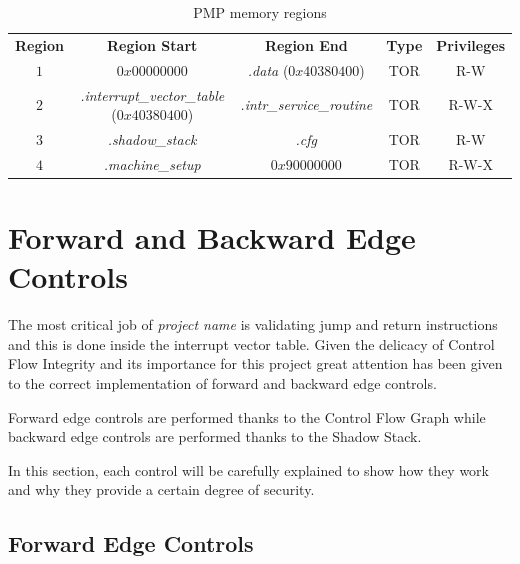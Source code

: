 \begin{table}
  \centering
  \begin{tabular}{|c|c|c|c|c|}
    \hline
    \textbf{Region}    & \textbf{Region Start}                             & \textbf{Region End}              & \textbf{Type} & \textbf{Privileges} \\
    \hhline{=====} $1$ & $0x00000000$                                      & \textit{.data} ($0x40380400$)    & TOR           & R-W                 \\
    \hline
    $2$                & \textit{.interrupt\_vector\_table} ($0x40380400$) & \textit{.intr\_service\_routine} & TOR           & R-W-X               \\
    \hline
    $3$                & \textit{.shadow\_stack}                           & \textit{.cfg}                    & TOR           & R-W                 \\
    \hline
    $4$                & \textit{.machine\_setup}                          & $0x90000000$                     & TOR           & R-W-X               \\
    \hline
  \end{tabular}
  \caption{PMP memory regions}
  \label{tab:pmpregions}
\end{table}

\section{Forward and Backward Edge Controls}
\label{sec:project_controls}

The most critical job of \textit{project name} is validating jump and return
instructions and this is done inside the interrupt vector table. Given the delicacy
of Control Flow Integrity and its importance for this project great attention has
been given to the correct implementation of forward and backward edge controls.

Forward edge controls are performed thanks to the Control Flow Graph while backward
edge controls are performed thanks to the Shadow Stack.

In this section, each control will be carefully explained to show how they work
and why they provide a certain degree of security.

\subsection{Forward Edge Controls}
\label{subsec:forward}


